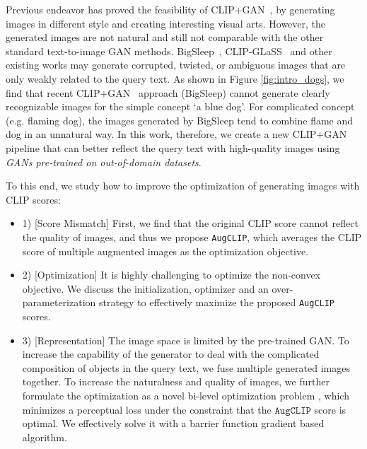 \documentclass[10pt,twocolumn,letterpaper]{article}
\newcommand{\ganclip}{CLIP+GAN}
\newcommand{\ourloss}{\texttt{AugCLIP}}
\begin{document}
Previous endeavor has proved the feasibility of \ganclip~\cite{bigsleep, galatolo2021generating}, 
by generating images in different style and creating interesting visual arts.
However, the generated images are not natural and still not comparable with the other standard text-to-image GAN methods. 
BigSleep~\cite{bigsleep}, CLIP-GLaSS~\cite{galatolo2021generating} and other existing works may generate corrupted, twisted, or ambiguous images that are only weakly related to the query text.
As shown in Figure \ref{fig:intro_dogs}, 
we find that recent \ganclip~ approach (BigSleep) 
cannot generate clearly recognizable images for the simple concept `a blue dog'.
For complicated concept (e.g. flaming dog), the images generated by BigSleep tend to combine flame and dog in an unnatural way.
In this work, therefore, we create a new \ganclip~ pipeline that can better reflect the query text with high-quality images using \emph{GANs pre-trained on out-of-domain datasets}.


To this end, we study how to improve the optimization of generating images with CLIP scores:
\begin{itemize}
    \item 1) [Score Mismatch] First, we find that the original CLIP score cannot reflect the quality of images, and thus we propose \ourloss, which averages the CLIP score of multiple augmented images as the optimization objective.
    \item 2) [Optimization] It is highly challenging to optimize the non-convex objective. We discuss the initialization, optimizer and an over-parameterization strategy to effectively maximize the proposed \ourloss~ scores. 
    \item 3) [Representation] The image space is limited by the pre-trained GAN. To increase the capability of the generator to deal with the complicated composition of objects in the query text,
    we fuse multiple generated images together. To increase the naturalness and quality of images, we further formulate the optimization as a novel bi-level optimization problem \cite{solodov2007bundle},
    which minimizes a perceptual loss \cite{johnson2016perceptual} under the constraint that the $\texttt{AugCLIP}$ score is optimal.
    We effectively solve it with a barrier function gradient based algorithm.
\end{itemize}
 
\end{document}
